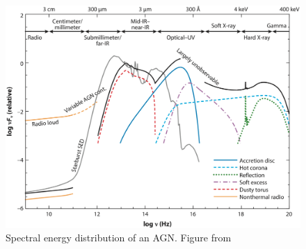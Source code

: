 \begin{figure}
\begin{center}
  \includegraphics[width=\textwidth]{Figs/Fig1_Hickox18.pdf}
  \vspace{-30pt}
  \caption{Spectral energy distribution of an AGN. Figure from \citet{2018ARA&A..56..625H}}
    \label{fig:AGN_SED}
\end{center}
\end{figure}

